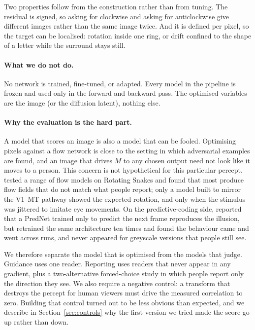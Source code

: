 Two properties follow from the construction rather than from tuning. The
residual is signed, so asking for clockwise and asking for anticlockwise give
different images rather than the same image twice. And it is defined per pixel,
so the target can be localised: rotation inside one ring, or drift confined to
the shape of a letter while the surround stays still.

\paragraph{What we do not do.}
No network is trained, fine-tuned, or adapted. Every model in the pipeline is
frozen and used only in the forward and backward pass. The optimised variables
are the image (or the diffusion latent), nothing else.

\paragraph{Why the evaluation is the hard part.}
A model that scores an image is also a model that can be fooled. Optimising
pixels against a flow network is close to the setting in which adversarial
examples are found, and an image that drives $M$ to any chosen output need not
look like it moves to a person. This concern is not hypothetical for this
particular percept. \citet{rosario2026illusory} tested a range of flow models
on Rotating Snakes and found that most produce flow fields that do not match
what people report; only a model built to mirror the V1--MT pathway
\cite{sun2025multiorder} showed the expected rotation, and only when the
stimulus was jittered to imitate eye movements. On the predictive-coding side,
\citet{watanabe2018prednet} reported that a PredNet trained only to predict the
next frame reproduces the illusion, but \citet{kirubeswaran2023inconsistent}
retrained the same architecture ten times and found the behaviour came and went
across runs, and never appeared for greyscale versions that people still see.

We therefore separate the model that is optimised from the models that judge.
Guidance uses one reader. Reporting uses readers that never appear in any
gradient, plus a two-alternative forced-choice study in which people report
only the direction they see. We also require a negative control: a transform
that destroys the percept for human viewers must drive the measured correlation
to zero. Building that control turned out to be less obvious than expected, and
we describe in Section~\ref{sec:controls} why the first version we tried made
the score go up rather than down.

